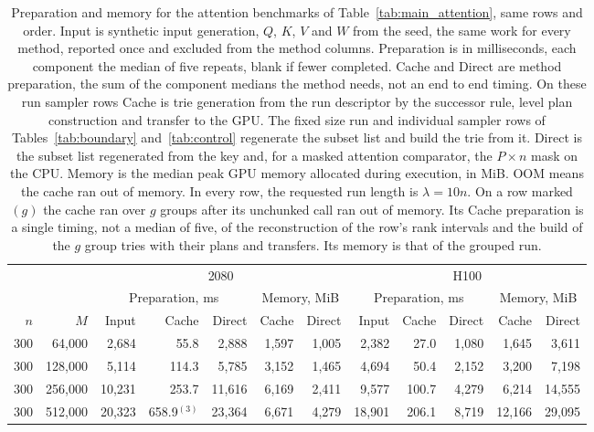 \begin{table}[!htbp]
\caption{Preparation and memory for the attention benchmarks of Table~\ref{tab:main_attention}, same rows and order. Input is synthetic input generation, $Q$, $K$, $V$ and $W$ from the seed, the same work for every method, reported once and excluded from the method columns. Preparation is in milliseconds, each component the median of five repeats, blank if fewer completed. Cache and Direct are method preparation, the sum of the component medians the method needs, not an end to end timing. On these run sampler rows Cache is trie generation from the run descriptor by the successor rule, level plan construction and transfer to the GPU. The fixed size run and individual sampler rows of Tables~\ref{tab:boundary} and~\ref{tab:control} regenerate the subset list and build the trie from it. Direct is the subset list regenerated from the key and, for a masked attention comparator, the $P \times n$ mask on the CPU. Memory is the median peak GPU memory allocated during execution, in MiB. OOM means the cache ran out of memory. In every row, the requested run length is $\lambda = 10n$. On a row marked $(g)$ the cache ran over $g$ groups after its unchunked call ran out of memory. Its Cache preparation is a single timing, not a median of five, of the reconstruction of the row's rank intervals and the build of the $g$ group tries with their plans and transfers. Its memory is that of the grouped run.}
\label{tab:prep_attention}
\footnotesize
\setlength{\tabcolsep}{2.5pt}
\begin{tabular}{rr rrrrr rrrrr}
\toprule
 &  & \multicolumn{5}{c}{2080} & \multicolumn{5}{c}{H100} \\
\cmidrule(lr){3-7} \cmidrule(lr){8-12}
 &  & \multicolumn{3}{c}{Preparation, ms} & \multicolumn{2}{c}{Memory, MiB} & \multicolumn{3}{c}{Preparation, ms} & \multicolumn{2}{c}{Memory, MiB} \\
\cmidrule(lr){3-5} \cmidrule(lr){6-7} \cmidrule(lr){8-10} \cmidrule(lr){11-12}
$n$ & $M$ & Input & Cache & Direct & Cache & Direct & Input & Cache & Direct & Cache & Direct \\
\midrule
300 & 64,000 & 2,684 & 55.8 & 2,888 & 1,597 & 1,005 & 2,382 & 27.0 & 1,080 & 1,645 & 3,611 \\
300 & 128,000 & 5,114 & 114.3 & 5,785 & 3,152 & 1,465 & 4,694 & 50.4 & 2,152 & 3,200 & 7,198 \\
300 & 256,000 & 10,231 & 253.7 & 11,616 & 6,169 & 2,411 & 9,577 & 100.7 & 4,279 & 6,214 & 14,555 \\
300 & 512,000 & 20,323 & 658.9$^{(3)}$ & 23,364 & 6,671 & 4,279 & 18,901 & 206.1 & 8,719 & 12,166 & 29,095 \\

\end{tabular}
\end{table}
